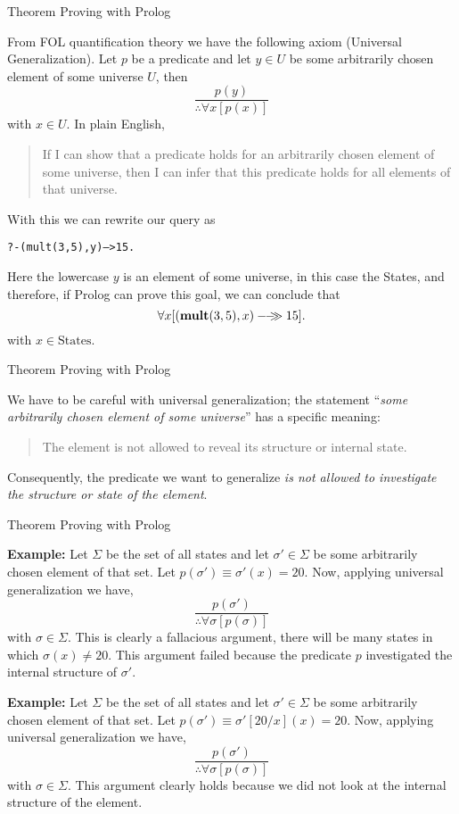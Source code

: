 \documentclass{beamer}
\begin{document}
\begin{frame}[fragile]{Theorem Proving with Prolog}

\scriptsize

From FOL quantification theory we have the following axiom (Universal Generalization).  Let $p$ be a predicate and let
$y\in U$ be some arbitrarily chosen element of some universe $U$, then
\[
\frac{p(y)}{\therefore \forall x[p(x)]}
\]
with $x\in U$.  In plain English,
\begin{quote}
If I can show that a predicate holds for an arbitrarily chosen element of some universe, then I can infer 
that this predicate holds for all elements of that universe.
\end{quote}
With this we can rewrite our query as
{\scriptsize
\begin{alltt}
?- (mult(3,5),{\color{red}y}) --> 15.
\end{alltt}
}
Here the lowercase $y$ is an element of some universe, in this case the States, and therefore, if Prolog can prove this
goal, we can conclude that
\[
\forall x [{({\bf mult}(3,5),x)}-\!\!-\!\!\!\!\gg{15}].
\]
with $x\in \mbox{States}$.
\end{frame}

\begin{frame}[fragile]{Theorem Proving with Prolog}

\scriptsize

We have to be careful with universal generalization; the statement  ``{\em some arbitrarily chosen element of some 
universe}'' has a
specific meaning:  
\begin{quote}
The element is not allowed to reveal its structure or internal state.
\end{quote}
Consequently, the predicate we want to generalize {\em is not allowed to investigate the structure or state of the
element}.



\end{frame}

\begin{frame}[fragile]{Theorem Proving with Prolog}

\scriptsize
{\bf Example:} Let $\Sigma$ be the set of all states and let $\sigma'\in\Sigma$ be some arbitrarily chosen element
of that set.  Let $p(\sigma') \equiv \sigma'(x) = 20$. Now, applying universal generalization we have,
\[
\frac{p(\sigma')}{\therefore \forall \sigma[p(\sigma)]}
\]
with $\sigma\in\Sigma$.  This is clearly a fallacious argument, there will be many states in which $\sigma(x) \ne 20$.
This argument failed because the predicate $p$ investigated the internal structure of $\sigma'$.

\vspace{.3in}
{\bf Example:} Let $\Sigma$ be the set of all states and let $\sigma'\in\Sigma$ be some arbitrarily chosen element
of that set.  Let $p(\sigma') \equiv \sigma'[20/x](x) = 20$. Now, applying universal generalization we have,
\[
\frac{p(\sigma')}{\therefore \forall \sigma[p(\sigma)]}
\]
with $\sigma\in\Sigma$.  This argument clearly holds because we did not look at the internal structure of the
element.

\end{frame}
\end{document}
